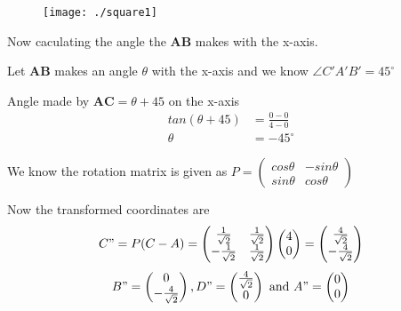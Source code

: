 \documentclass[12pt]{article}
\let\vec\mathbf
\begin{document}
\begin{figure}[!h]
	\begin{center} 
	    \texttt{[image: ./square1]}
	\end{center}
\caption{}
\label{fig:Fig1}
\end{figure}


Now caculating the angle the $\vec{AB}$ makes with the x-axis.

Let $\vec{AB}$ makes an angle $\theta$ with the x-axis and we know $\angle C'A'B' = 45^{\circ}$

Angle made by $\vec{AC} = \theta + 45 $ on the x-axis
\begin{align*}
tan(\theta + 45) &= \frac{0-0}{4-0}\\
\theta &= -45^{\circ}
\end{align*}

We know the rotation matrix is given as
$P =
\begin{pmatrix}
cos\theta & -sin\theta \\
sin\theta & cos\theta
\end{pmatrix}
$

Now the transformed coordinates are 
\begin{align*}
C" = P(C-A) =
\begin{pmatrix}
\frac{1}{\sqrt{2}} & \frac{1}{\sqrt{2}} \\
-\frac{1}{\sqrt{2}} & \frac{1}{\sqrt{2}}
\end{pmatrix}
\begin{pmatrix}
4 \\
0
\end{pmatrix} = 
\begin{pmatrix}
\frac{4}{\sqrt{2}} \\
-\frac{4}{\sqrt{2}}
\end{pmatrix}
\end{align*}
\begin{align*}
B" = \begin{pmatrix}
 0\\
 -\frac{4}{\sqrt{2}}
\end{pmatrix},
D" = \begin{pmatrix}
 \frac{4}{\sqrt{2}}\\
 0
\end{pmatrix} \text{ and }
A" =
\begin{pmatrix}
0 \\
 0
\end{pmatrix}
\end{align*}
\end{document}
